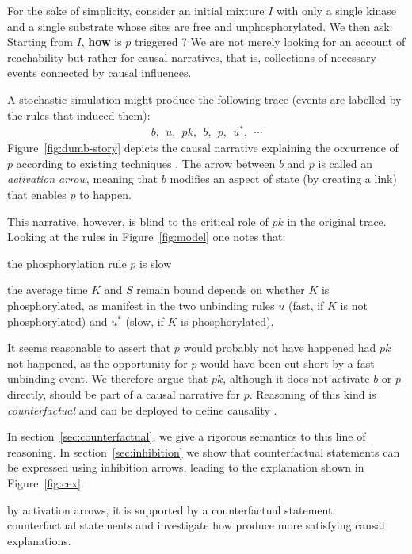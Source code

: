 

For the sake of simplicity, consider an initial mixture $I$ with only
a single kinase and a single substrate whose sites are free and
unphosphorylated. We then ask: Starting from $I$, \textbf{how} is $p$
triggered ? We are not merely looking for an account of reachability
but rather for causal narratives, that is, collections of necessary
events connected by causal influences.

A stochastic simulation \cite{DanosEtAl-APLAS07} might produce the
following trace (events are labelled by the rules that induced them):
\begin{align}\label{example-trace} b,\ \ u,\ \ pk,\ \ b,\ \ p,\ \
  u^{*},\ \ \cdots
\end{align} Figure~\ref{fig:dumb-story} depicts the causal narrative
explaining the occurrence of $p$ according to existing techniques
\cite{DBLP:conf/fsttcs/DanosFFHH12,DanosEtAl-CONCUR07}. The arrow
between $b$ and $p$ is called an \textit{activation arrow}, meaning
that $b$ modifies an aspect of state (by creating a link) that enables
$p$ to happen.



This narrative, however, is blind to the critical role of $pk$ in the
original trace. Looking at the rules in Figure~\ref{fig:model} one
notes that:
\begin{inparaenum}[(i)]
\item the phosphorylation rule $p$ is slow
\item the average time $K$ and $S$ remain bound depends on whether $K$
  is phosphorylated, as manifest in the two unbinding rules $u$ (fast,
  if $K$ is not phosphorylated) and $u^{*}$ (slow, if $K$ is
  phosphorylated).
\end{inparaenum} It seems reasonable to assert that $p$ would probably
not have happened had $pk$ not happened, as the opportunity for $p$
would have been cut short by a fast unbinding event. We therefore
argue that $pk$, although it does not activate $b$ or $p$ directly,
should be part of a causal narrative for $p$. Reasoning of this kind
is \textit{counterfactual} and can be deployed to define causality
\cite{lewis1974causation,lewis2000causation}.

In section~\ref{sec:counterfactual}, we give a rigorous semantics to
this line of reasoning. In section~\ref{sec:inhibition} we show that
counterfactual statements can be expressed using inhibition arrows,
leading to the explanation shown in Figure~\ref{fig:cex}.

by activation arrows, it is supported by a counterfactual statement.
counterfactual statements and investigate how %
produce more satisfying causal explanations.